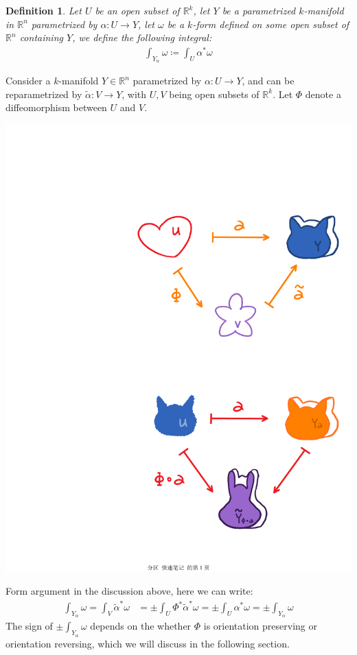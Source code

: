 \documentclass[15pt]{book}
\theoremstyle{break}
\theoremstyle{break}
\newtheorem{defn}{Definition}[corL]
\newcommand{\R}{\mathbb{R}}
\newcommand{\that}[1]{\widetilde{#1}}
\begin{document}
\begin{defn}
Let $U$ be an open subset of $\R^k$, let $Y$ be a parametrized $k$-manifold in $\R^n$ parametrized by $\alpha:U \to Y$, let $\omega$ be a $k$-form defined on some open subset of $\R^n$ containing $Y$, we define the following integral:
\begin{align*}
\int_{Y_\alpha} \omega \coloneqq \int_U \alpha^*\omega
\end{align*} 
\end{defn}
\newpage

Consider a $k$-manifold $Y \in \R^n$ parametrized by $\alpha:U \to Y$, and can be reparametrized by $\that{\alpha}:V \to Y$, with $U,V$ being open subsets of $\R^k$. Let $\Phi$ denote a diffeomorphism between $U$ and $V$. 
\begin{center}
\includegraphics[scale=0.5]{Intkform.pdf}
\end{center}

Form argument in the discussion above, here we can write:
\begin{align*}
\int_{Y_\alpha} \omega = \int_V \that{\alpha}^*\omega &= \pm\int_U \Phi^*\that{\alpha}^*\omega = \pm \int_U \alpha^*\omega = \pm \int_{Y_\alpha} \omega
\end{align*}
The sign of $\pm \int_{Y_\alpha} \omega$ depends on the whether $\Phi$ is orientation preserving or orientation reversing, which we will discuss in the following section.\\
\end{document}
